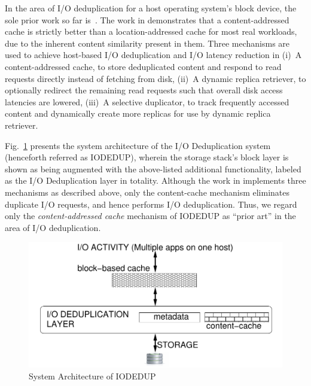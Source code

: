 In the area of I/O deduplication for a host operating system's block
device, the sole prior work so far is~\cite{iodedup}.
The work in \cite{iodedup} demonstrates that a content-addressed cache is
strictly better than a location-addressed cache for most real workloads, due to
the inherent content similarity present in them.
Three mechanisms are used to achieve 
host-based I/O deduplication
and I/O latency reduction in \cite{iodedup}\textemdash{}(i)~A
content-addressed cache, to store deduplicated content and respond to read
requests directly instead of fetching from disk,
(ii)~A dynamic replica retriever, to optionally
redirect the remaining read requests such that overall disk access
latencies are lowered, (iii)~A selective duplicator, to track frequently
accessed content and dynamically create more replicas for use
by dynamic replica retriever.

Fig.~\ref{fig:iodedup-arch}
presents the system architecture of the I/O Deduplication system
(henceforth referred as IODEDUP), wherein
the storage stack's block layer is shown as being augmented with the
above-listed additional functionality, 
labeled as the I/O Deduplication layer in totality.
Although the work in \cite{iodedup} implements three mechanisms as
described above, only the content-cache mechanism eliminates duplicate
I/O requests, and hence performs I/O deduplication.
Thus, we regard only the \textit{content-addressed cache} 
mechanism of IODEDUP as ``prior art'' in the area of I/O 
deduplication.

\begin{figure}[t]
\centering
\includegraphics[scale=0.65]{confided-figures/main/sys-arch-iodedup-host.pdf}
\vspace{-0.15in}
\caption{System Architecture of IODEDUP}
\label{fig:iodedup-arch}
\end{figure}

